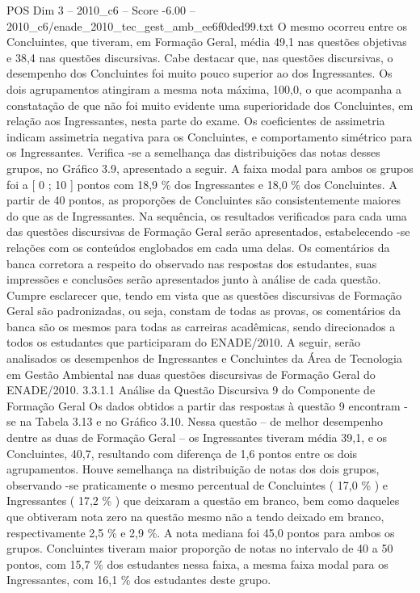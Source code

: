 \begin{textsample}{POS Dim 3 – 2010\_c6 – Score -6.00 – 2010\_c6/enade\_2010\_tec\_gest\_amb\_ee6f0ded99.txt}
O mesmo ocorreu entre os Concluintes, que tiveram, em Formação Geral, média 49,1 nas questões objetivas e 38,4 nas questões discursivas.
Cabe destacar que, nas questões discursivas, o desempenho dos Concluintes foi muito pouco superior ao dos Ingressantes.
Os dois agrupamentos atingiram a mesma nota máxima, 100,0, o que acompanha a constatação de que não foi muito evidente uma superioridade dos Concluintes, em relação aos Ingressantes, nesta parte do exame.
Os coeficientes de assimetria indicam assimetria negativa para os Concluintes, e comportamento simétrico para os Ingressantes.
Verifica -se a semelhança das distribuições das notas desses grupos, no Gráfico 3.9, apresentado a seguir.
A faixa modal para ambos os grupos foi a [ 0 ; 10 ] pontos com 18,9 \% dos Ingressantes e 18,0 \% dos Concluintes.
A partir de 40 pontos, as proporções de Concluintes são consistentemente maiores do que as de Ingressantes.
Na sequência, os resultados verificados para cada uma das questões discursivas de Formação Geral serão apresentados, estabelecendo -se relações com os conteúdos englobados em cada uma delas.
Os comentários da banca corretora a respeito do observado nas respostas dos estudantes, suas impressões e conclusões serão apresentados junto à análise de cada questão.
Cumpre esclarecer que, tendo em vista que as questões discursivas de Formação Geral são padronizadas, ou seja, constam de todas as provas, os comentários da banca são os mesmos para todas as carreiras acadêmicas, sendo direcionados a todos os estudantes que participaram do ENADE/2010.
A seguir, serão analisados os desempenhos de Ingressantes e Concluintes da Área de Tecnologia em Gestão Ambiental nas duas questões discursivas de Formação Geral do ENADE/2010. 3.3.1.1 Análise da Questão Discursiva 9 do Componente de Formação Geral Os dados obtidos a partir das respostas à questão 9 encontram -se na Tabela 3.13 e no Gráfico 3.10.
Nessa questão – de melhor desempenho dentre as duas de Formação Geral – os Ingressantes tiveram média 39,1, e os Concluintes, 40,7, resultando com diferença de 1,6 pontos entre os dois agrupamentos.
Houve semelhança na distribuição de notas dos dois grupos, observando -se praticamente o mesmo percentual de Concluintes ( 17,0 \% ) e Ingressantes ( 17,2 \% ) que deixaram a questão em branco, bem como daqueles que obtiveram nota zero na questão mesmo não a tendo deixado em branco, respectivamente 2,5 \% e 2,9 \%.
A nota mediana foi 45,0 pontos para ambos os grupos.
Concluintes tiveram maior proporção de notas no intervalo de 40 a 50 pontos, com 15,7 \% dos estudantes nessa faixa, a mesma faixa modal para os Ingressantes, com 16,1 \% dos estudantes deste grupo.

\end{textsample}
